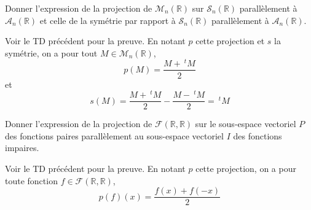 \documentclass[a4paper,10pt]{report}
\begin{document}
\begin{Exa} Donner l'expression de la projection de $\mathcal{M}_n(\mathbb{R})$ sur $\mathcal{S}_n(\mathbb{R})$ parallèlement à $\mathcal{A}_n(\mathbb{R})$ et celle de la symétrie par rapport à $\mathcal{S}_n(\mathbb{R})$ parallèlement à $\mathcal{A}_n(\mathbb{R})$.
\end{Exa}

\corr Voir le TD précédent pour la preuve. En notant $p$ cette projection et $s$ la symétrie, on a pour tout $M \in \mathcal{M}_n(\mathbb{R})$, 
$$ p(M) = \dfrac{M+ ~^t M}{2}$$
et 
$$ s(M) =  \dfrac{M+ ~^t M}{2} -  \dfrac{M- ~^t M}{2} =~^t M$$



\begin{Exa} Donner l'expression de la projection de $\mathcal{F}(\mathbb{R}, \mathbb{R})$ sur le sous-espace vectoriel $P$ des fonctions paires parallèlement au sous-espace vectoriel $I$ des fonctions impaires.
\end{Exa}

\corr Voir le TD précédent pour la preuve. En notant $p$ cette projection, on a pour toute fonction $f \in \mathcal{F}(\mathbb{R}, \mathbb{R})$,
$$ p(f)(x) = \dfrac{f(x)+f(-x)}{2}$$




%
%
%
%
%
%
%
%

%    
%
\end{document}
